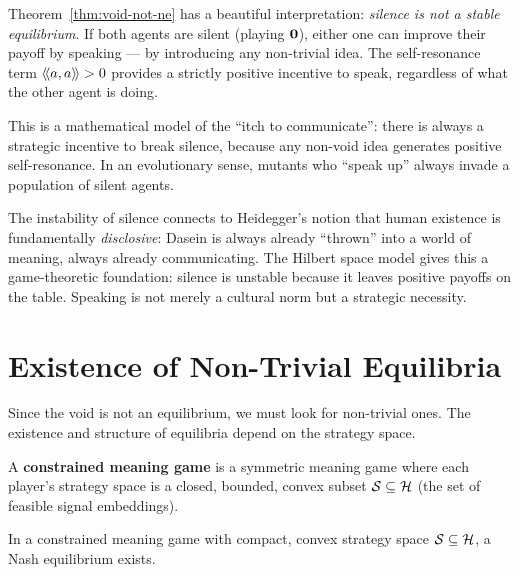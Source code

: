 \begin{interpretation}
\label{interp:silence-unstable}
Theorem~\ref{thm:void-not-ne} has a beautiful interpretation: \emph{silence is
not a stable equilibrium}. If both agents are silent (playing $\mathbf{0}$), either
one can improve their payoff by speaking --- by introducing any non-trivial
idea. The self-resonance term $\langle\!\langle a, a \rangle\!\rangle > 0$ provides a strictly positive
incentive to speak, regardless of what the other agent is doing.

This is a mathematical model of the ``itch to communicate'': there is always a
strategic incentive to break silence, because any non-void idea generates
positive self-resonance. In an evolutionary sense, mutants who ``speak up''
always invade a population of silent agents.

The instability of silence connects to Heidegger's notion that human existence
is fundamentally \emph{disclosive}: Dasein is always already ``thrown'' into a
world of meaning, always already communicating. The Hilbert space model gives
this a game-theoretic foundation: silence is unstable because it leaves positive
payoffs on the table. Speaking is not merely a cultural norm but a strategic
necessity.
\end{interpretation}


\section{Existence of Non-Trivial Equilibria}

Since the void is not an equilibrium, we must look for non-trivial ones. The
existence and structure of equilibria depend on the strategy space.

\begin{definition}
\label{def:constrained-game}
A \textbf{constrained meaning game} is a symmetric meaning game where each
player's strategy space is a closed, bounded, convex subset $\mathcal{S}
\subseteq \mathcal{H}$ (the set of feasible signal embeddings).
\end{definition}

\begin{theorem}
\label{thm:ne-existence}
In a constrained meaning game with compact, convex strategy space $\mathcal{S}
\subseteq \mathcal{H}$, a Nash equilibrium exists.
\end{theorem}

